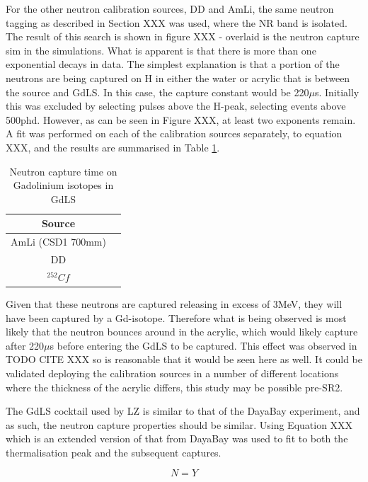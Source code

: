 \par
For the other neutron calibration sources, DD and AmLi, the same neutron tagging as described in Section XXX was used, where the NR band is isolated.
The result of this search is shown in figure XXX - overlaid is the neutron capture sim in the simulations.
What is apparent is that there is more than one exponential decays in data.
The simplest explanation is that a portion of the neutrons are being captured on H in either the water or acrylic that is between the source and GdLS.
In this case, the capture constant would be 220$\mu$s.
Initially this was excluded by selecting pulses above the H-peak, selecting events above 500phd.
However, as can be seen in Figure XXX, at least two exponents remain.
A fit was performed on each of the calibration sources separately, to equation XXX, and the results are summarised in Table \ref{tab:neutron_capture_times}.
\begin{table}[!htbp]
    \centering
    \begin{tabular}{c|c}
        Source            &  \\ \hline
        AmLi (CSD1 700mm) & \\ 
        DD                & \\
        ${}^{252}{Cf}$    &
    \end{tabular}
    \caption{Neutron capture time on Gadolinium isotopes in GdLS}
    \label{tab:neutron_capture_times}
\end{table}

Given that these neutrons are captured releasing in excess of 3MeV, they will have been captured by a Gd-isotope. 
Therefore what is being observed is most likely that the neutron bounces around in the acrylic, which would likely capture after 220$\mu$s before entering the GdLS to be captured.
This effect was observed in TODO CITE XXX so is reasonable that it would be seen here as well.
It could be validated deploying the calibration sources in a number of different locations where the thickness of the acrylic differs, this study may be possible pre-SR2.


\par
The GdLS cocktail used by LZ is similar to that of the DayaBay experiment, and as such, the neutron capture properties should be similar.
Using Equation XXX which is an extended version of that from DayaBay \cite{Dayabay_neutron_capture_fit_ref} was used to fit to both the thermalisation peak and the subsequent captures.

\begin{equation}
    N = Y
\end{equation}

